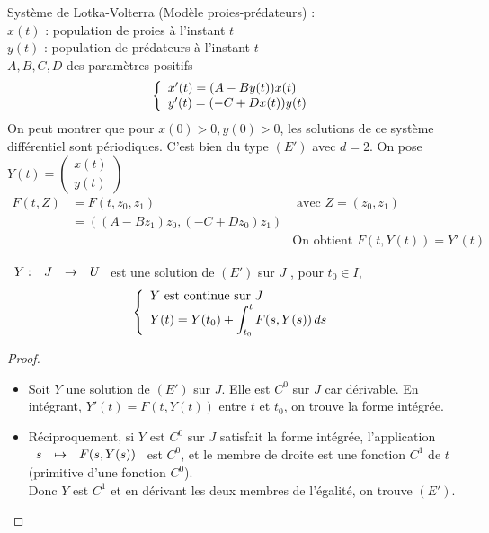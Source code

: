 \documentclass[]{report}
\begin{document}
\begin{ex}
    Système de Lotka-Volterra (Modèle proies-prédateurs) :\\
    $x(t)$ : population de proies à l'instant $t$\\
    $y(t)$ : population de prédateurs à l'instant $t$\\
    $A,B,C,D$ des paramètres positifs\\
    $$\left\{\begin{array}{ll} x'(t)=(A-By(t))x(t)\\
    y'(t)=(-C+Dx(t))y(t) \end{array} \right.$$
    On peut montrer que pour $x(0)>0,y(0)>0$, les solutions de ce système différentiel sont périodiques. C'est bien du type $(E')$ avec $d=2$. On pose $Y(t)=\begin{pmatrix}
        x(t)\\y(t)
    \end{pmatrix}$\\
    \begin{align*}
    F(t,Z)&=F(t,z_0,z_1)&\text{ avec } Z=(z_0,z_1)\\
    &=((A-Bz_1)z_0,(-C+Dz_0)z_1)&\\
    &&\text{On obtient } F(t,Y(t))=Y'(t)
    \end{align*}
\end{ex}

\begin{prop}
    $\begin{array}{ccccc} Y : & J & \to & U \end{array}$ est une solution de $(E')$ sur $J$ \ssi, pour $t_0\in I$,\\
    $$\left\{\begin{array}{ll} Y \text{ est continue sur }J\\
    \displaystyle{Y(t)=Y(t_0)+\int_{t_0}^tF(s,Y(s))\,ds} \end{array} \right.$$
\end{prop}

\begin{proof}
    \begin{itemize}
        \item Soit $Y$ une solution de $(E')$ sur $J$. Elle est $C^0$ sur $J$ car dérivable. En intégrant, $Y'(t)=F(t,Y(t))$ entre $t$ et $t_0$, on trouve la forme intégrée.
        \item Réciproquement, si $Y$ est $C^0$ sur $J$ satisfait la forme intégrée, l'application $\begin{array}{ccccc} s & \mapsto & F(s,Y(s)) \end{array}$ est $C^0$, et le membre de droite est une fonction $C^1$ de $t$ (primitive d'une fonction $C^0$).\\
        Donc $Y$ est $C^1$ et en dérivant les deux membres de l'égalité, on trouve $(E')$.
    \end{itemize}
\end{proof}
\end{document}
